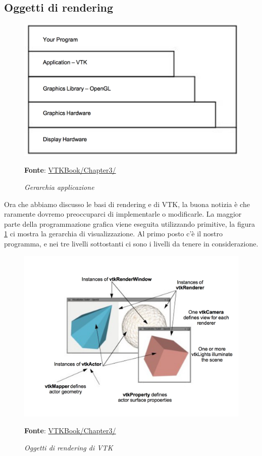 \subsection{Oggetti di rendering}\label{sec:oggetti-rendering}
\begin{figure}[h]
    \centering
    \includegraphics[scale=0.4]{immagini/volumerendering/layers.png}
    \caption{\textit{Gerarchia applicazione}}
    \textbf{Fonte}: \href{https://lorensen.github.io/VTKExamples/site/VTKBook/03Chapter3/}{VTKBook/Chapter3/}
    \label{fig: vtk-layers}
\end{figure}

Ora che abbiamo discusso le basi di rendering e di VTK, la buona notizia è che raramente dovremo preoccuparci di implementarle o modificarle. La maggior parte della programmazione grafica viene eseguita utilizzando primitive, la figura \ref{fig: vtk-layers} ci mostra la gerarchia di visualizzazione. Al primo posto c'è il nostro programma, e nei tre livelli sottostanti ci sono i livelli da tenere in considerazione.

\begin{figure}[h]
    \centering
    \includegraphics[scale=0.5]{immagini/volumerendering/vtkobjects.png}
    \caption{\textit{Oggetti di rendering di VTK}}
    \textbf{Fonte}: \href{https://lorensen.github.io/VTKExamples/site/VTKBook/03Chapter3/}{VTKBook/Chapter3/}
    \label{fig: Oggetti Rendering VTK}
\end{figure}

